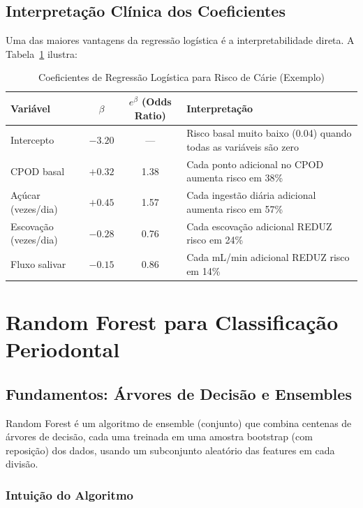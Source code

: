 \subsection{Interpretação Clínica dos Coeficientes}

Uma das maiores vantagens da regressão logística é a interpretabilidade direta. A Tabela~\ref{tab:coeficientes-carie} ilustra:

\begin{table}[H]
  \centering
  \caption{Coeficientes de Regressão Logística para Risco de Cárie (Exemplo)}
  \label{tab:coeficientes-carie}
  \begin{tabularx}{\textwidth}{lccX}
    \toprule
    \textbf{Variável} & $\beta$ & $e^{\beta}$ (Odds Ratio) & \textbf{Interpretação} \\
    \midrule
    Intercepto & $-3.20$ & — & Risco basal muito baixo (0.04) quando todas as variáveis são zero \\
    CPOD basal & $+0.32$ & 1.38 & Cada ponto adicional no CPOD aumenta risco em 38\% \\
    Açúcar (vezes/dia) & $+0.45$ & 1.57 & Cada ingestão diária adicional aumenta risco em 57\% \\
    Escovação (vezes/dia) & $-0.28$ & 0.76 & Cada escovação adicional REDUZ risco em 24\% \\
    Fluxo salivar & $-0.15$ & 0.86 & Cada mL/min adicional REDUZ risco em 14\% \\
    \bottomrule
  \end{tabularx}
\end{table}

\section{Random Forest para Classificação Periodontal}

\subsection{Fundamentos: Árvores de Decisão e Ensembles}

Random Forest  é um algoritmo de ensemble (conjunto) que combina centenas de árvores de decisão, cada uma treinada em uma amostra bootstrap (com reposição) dos dados, usando um subconjunto aleatório das features em cada divisão.

\subsubsection{Intuição do Algoritmo}

